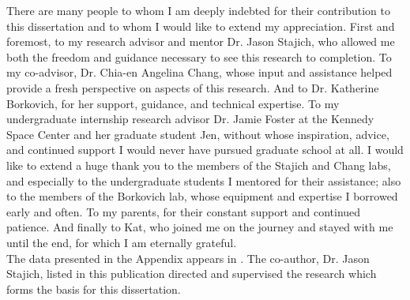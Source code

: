 \documentclass[11pt]{UCR_latex_template/ucr}
\begin{document}
\begin{frontmatter}
\begin{acknowledgements}
There are many people to whom I am deeply indebted for their contribution to this dissertation and to whom I would like to extend my appreciation. First and foremost, to my research advisor and mentor Dr. Jason Stajich, who allowed me both the freedom and guidance necessary to see this research to completion. To my co-advisor, Dr. Chia-en Angelina Chang, whose input and assistance helped provide a fresh perspective on aspects of this research. And to Dr. Katherine Borkovich, for her support, guidance, and technical expertise. To my undergraduate internship research advisor Dr. Jamie Foster at the Kennedy Space Center and her graduate student Jen, without whose inspiration, advice, and continued support I would never have pursued graduate school at all. I would like to extend a huge thank you to the members of the Stajich and Chang labs, and especially to the undergraduate students I mentored for their assistance; also to the members of the Borkovich lab, whose equipment and expertise I borrowed early and often. To my parents, for their constant support and continued patience. And finally to Kat, who joined me on the journey and stayed with me until the end, for which I am eternally grateful.\\
The data presented in the Appendix appears in \cite{James2013}. The co-author, Dr. Jason Stajich, listed in this publication directed and supervised the research which forms the basis for this dissertation.\\
\end{acknowledgements}




\tableofcontents
\listoffigures
\listoftables
\end{frontmatter}
\end{document}
